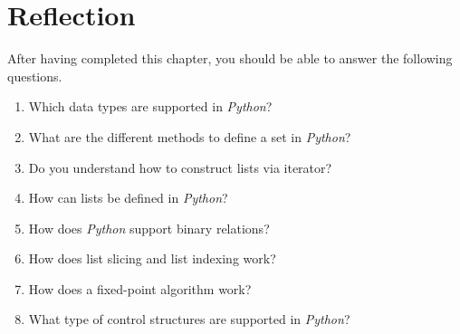 \section{Reflection}
After having completed this chapter, you should be able to answer the following questions.
\begin{enumerate}
\item Which data types are supported in \textsl{Python}?
\item What are the different methods to define a set in \textsl{Python}?
\item Do you understand how to construct lists via iterator? 
\item How can lists be defined in \textsl{Python}?
\item How does \textsl{Python} support binary relations?
\item How does list slicing and list indexing work?
\item How does a fixed-point algorithm work?
\item What type of control structures are supported in \textsl{Python}?
\end{enumerate}


